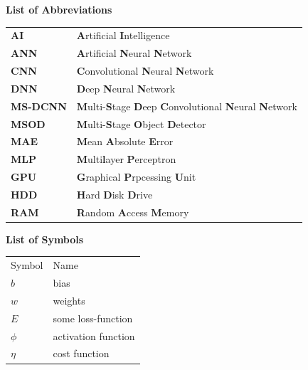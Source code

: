 \documentclass[12pt]{extarticle}
\begin{document}
	\newpage
	\LARGE{\textbf{List of Abbreviations}}\\ \vspace{1cm}
	\begin{center}
		\begin{tabular}{l l}
			\multicolumn{1}{p{3cm}}{\large{\textbf{AI}}} &  \multicolumn{1}{p{8cm}}{\large{\textbf{A}rtificial \textbf{I}ntelligence}} \\
			\multicolumn{1}{p{3cm}}{\large{\textbf{ANN}}} &  \multicolumn{1}{p{8cm}}{\large{\textbf{A}rtificial \textbf{N}eural \textbf{N}etwork}} \\
			\multicolumn{1}{p{3cm}}{\large{\textbf{CNN}}} &  \multicolumn{1}{p{8cm}}{\large{\textbf{C}onvolutional \textbf{N}eural \textbf{N}etwork}}\\ 
			\multicolumn{1}{p{3cm}}{\large{\textbf{DNN}}} &  \multicolumn{1}{p{8cm}}{\large{\textbf{D}eep \textbf{N}eural \textbf{N}etwork}} \\
			\multicolumn{1}{p{3cm}}{\large{\textbf{MS-DCNN}}} &  \multicolumn{1}{p{8cm}}{\large{\textbf{M}ulti-\textbf{S}tage \textbf{D}eep \textbf{C}onvolutional \textbf{N}eural \textbf{N}etwork}}\\ 
			\multicolumn{1}{p{3cm}}{\large{\textbf{MSOD}}} &  \multicolumn{1}{p{8cm}}{\large{\textbf{M}ulti-\textbf{S}tage \textbf{O}bject \textbf{D}etector}}\\ 
			\multicolumn{1}{p{3cm}}{\large{\textbf{MAE}}} &  \multicolumn{1}{p{8cm}}{\large{\textbf{M}ean \textbf{A}bsolute \textbf{E}rror}}\\  
			\multicolumn{1}{p{3cm}}{\large{\textbf{MLP}}} &  \multicolumn{1}{p{8cm}}{\large{\textbf{M}ulti\textbf{l}ayer \textbf{P}erceptron}}\\ 
			\multicolumn{1}{p{3cm}}{\large{\textbf{GPU}}} &  \multicolumn{1}{p{8cm}}{\large{\textbf{G}raphical \textbf{P}rpcessing \textbf{U}nit}}\\ 
			\multicolumn{1}{p{3cm}}{\large{\textbf{HDD}}} &  \multicolumn{1}{p{8cm}}{\large{\textbf{H}ard \textbf{D}isk \textbf{D}rive}}\\ 
			\multicolumn{1}{p{3cm}}{\large{\textbf{RAM}}} &  \multicolumn{1}{p{8cm}}{\large{\textbf{R}andom \textbf{A}ccess \textbf{M}emory}}
			 
		\end{tabular}
	\end{center}

	\newpage
	\LARGE{\textbf{List of Symbols}}\\ \vspace{1cm}
	\large{}
	\begin{center}
		\begin{tabular}{l l}
			{Symbol} & {Name} \\
			$b$ & bias\\
			$w$ & weights\\
			$E$ & some loss-function\\
			$\phi$ & activation function\\
			$\eta$ & cost function
		\end{tabular}
	\end{center}
	
\end{document}
